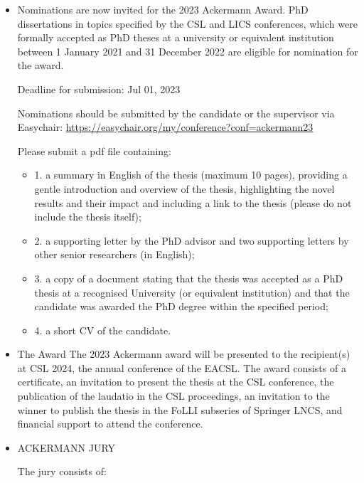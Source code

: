 \documentclass[prodmode,acmtecs]{acmsmall} %
\begin{document}
\begin{itemize}\item  Nominations are now invited for the 2023 Ackermann Award. PhD dissertations in topics specified by the CSL and LICS conferences, which were formally accepted as PhD theses at a university or equivalent institution between 1 January 2021 and 31 December 2022 are eligible for nomination for the award. 
 
Deadline for submission: Jul 01, 2023 
 
  Nominations should be submitted by the candidate or the supervisor via Easychair: \href{https://easychair.org/my/conference?conf=ackermann23}{https://easychair.org/my/conference?conf=ackermann23} 
 
  Please submit a pdf file containing:  
 
\begin{itemize}\item  1. a summary in English of the thesis (maximum 10 pages), providing a gentle introduction and overview of the thesis, highlighting the novel results and their impact and including a link to the thesis (please do not include the thesis itself); 
\item  2. a supporting letter by the PhD advisor and two supporting letters by other senior researchers (in English); 
\item  3. a copy of a document stating that the thesis was accepted as a PhD thesis at a recognised University (or equivalent institution) and that the candidate was awarded the PhD degree within the specified period; 
\item  4. a short CV of the candidate.
\end{itemize} 
\item  The Award The 2023 Ackermann award will be presented to the recipient(s) at CSL 2024, the annual conference of the EACSL. The award consists of a certificate, an invitation to present the thesis at the CSL conference, the publication of the laudatio in the CSL proceedings, an invitation to the winner to publish the thesis in the FoLLI subseries of Springer LNCS, and financial support to attend the conference.  
 
\item  ACKERMANN JURY 
 
  The jury consists of: 
 

\end{itemize}
\end{document}
